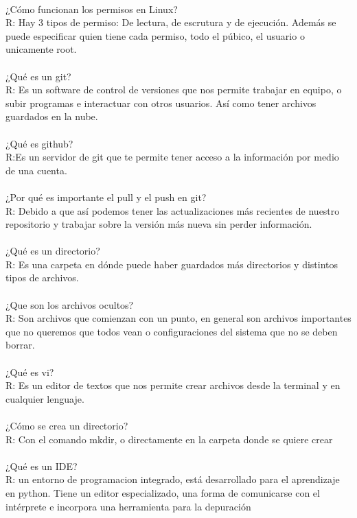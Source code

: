 \documentclass{book}
\begin{document}
	\\
	¿Cómo funcionan los permisos en Linux?\\
	R: Hay 3 tipos de permiso: De lectura, de escrutura y de ejecución. Además se puede especificar quien tiene cada permiso, todo el púbico, el usuario o unicamente root.\\
	\\ 
	¿Qué es un git?\\
	R: Es un software de control de versiones que nos permite trabajar en equipo, o subir programas e interactuar con otros usuarios. Así como tener archivos guardados en la nube.
	\\
	\\
	¿Qué es github?\\
	R:Es un servidor de git que te permite tener acceso a la información por medio de una cuenta.\\
	\\
	¿Por qué es importante el pull y el push en git?\\
	R: Debido a que así podemos tener las actualizaciones más recientes de nuestro repositorio y trabajar sobre la versión más nueva sin perder información.\\
	\\  
	¿Qué es un directorio?\\
	R: Es una carpeta en dónde puede haber guardados más directorios y distintos tipos de archivos.\\
	\\
	¿Que son los archivos ocultos?\\
	R: Son archivos que comienzan con un punto, en general son archivos importantes que no queremos que todos vean o configuraciones del sistema que no se deben borrar.\\
	\\
	¿Qué es vi?\\
	R: Es un editor de textos que nos permite crear archivos desde la terminal y en cualquier lenguaje.\\
	\\
	¿Cómo se crea un directorio?\\
	R: Con el comando mkdir, o directamente en la carpeta donde se quiere crear\\
	\\
	¿Qué es un IDE?\\
	R: un entorno de programacion integrado, está desarrollado para el aprendizaje en python. Tiene un editor especializado, una forma de comunicarse con el intérprete e incorpora una herramienta para la depuración \\
\end{document}
